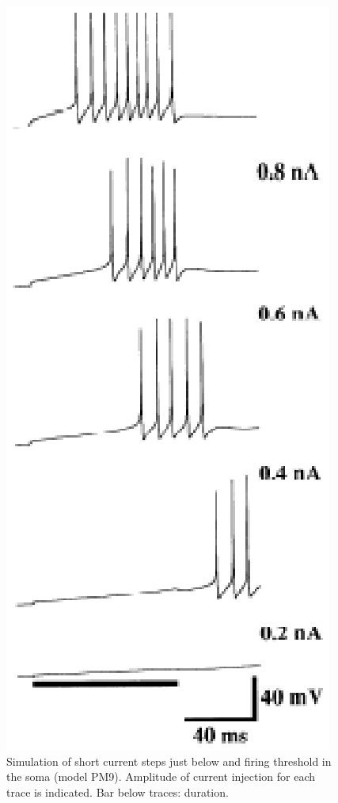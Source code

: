 \documentclass[12pt]{article}
\begin{document}
\begin{figure}[h]
\centering
   \includegraphics[scale=0.75]{figures/Fig.1.5.eps}
   \caption{Simulation of short current steps just below and firing threshold in the soma (model PM9). Amplitude of current injection for each trace is indicated. Bar below traces: duration.}
   \label{fig:DS1.5}
\end{figure}
\end{document}
